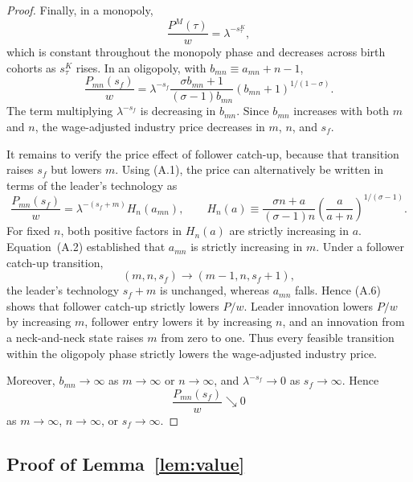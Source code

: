 \documentclass[12pt]{article}
\begin{document}
\begin{proof}
Finally, in a monopoly,
\[\frac{P^M(\tau)}{w}=\lambda^{-s^K_\tau},\]
which is constant throughout the monopoly phase and decreases across birth cohorts as \(s^K_\tau\) rises. In an oligopoly, with \(b_{mn}\equiv a_{mn}+n-1\),
\[\frac{P_{mn}(s_f)}{w}=
\lambda^{-s_f}\frac{\sigma b_{mn}+1}{(\sigma-1)b_{mn}}(b_{mn}+1)^{1/(1-\sigma)} . \tag{A.5}\]
The term multiplying \(\lambda^{-s_f}\) is decreasing in \(b_{mn}\). Since \(b_{mn}\) increases with both \(m\) and \(n\), the wage-adjusted industry price decreases in \(m\), \(n\), and \(s_f\).

It remains to verify the price effect of follower catch-up, because that transition raises \(s_f\) but lowers \(m\). Using (A.1), the price can alternatively be written in terms of the leader's technology as
\[\frac{P_{mn}(s_f)}{w}=\lambda^{-(s_f+m)}H_n(a_{mn}),\qquad H_n(a)\equiv
\frac{\sigma n+a}{(\sigma-1)n}\left(\frac{a}{a+n}\right)^{1/(\sigma-1)}.\tag{A.6}\]
For fixed \(n\), both positive factors in \(H_n(a)\) are strictly increasing in \(a\). Equation~(A.2) established that \(a_{mn}\) is strictly increasing in \(m\). Under a follower catch-up transition,
\[(m,n,s_f)\longrightarrow(m-1,n,s_f+1),\]
the leader's technology \(s_f+m\) is unchanged, whereas \(a_{mn}\) falls. Hence (A.6) shows that follower catch-up strictly lowers \(P/w\). Leader innovation lowers \(P/w\) by increasing \(m\), follower entry lowers it by increasing \(n\), and an innovation from a neck-and-neck state raises \(m\) from zero to one. Thus every feasible transition within the oligopoly phase strictly lowers the wage-adjusted industry price.

Moreover, \(b_{mn}\to\infty\) as \(m\to\infty\) or \(n\to\infty\), and \(\lambda^{-s_f}\to0\) as \(s_f\to\infty\). Hence
\[\frac{P_{mn}(s_f)}{w}\searrow0\]
as \(m\to\infty\), \(n\to\infty\), or \(s_f\to\infty\).
\end{proof}

\subsection{Proof of Lemma~\ref{lem:value}}
\end{document}
